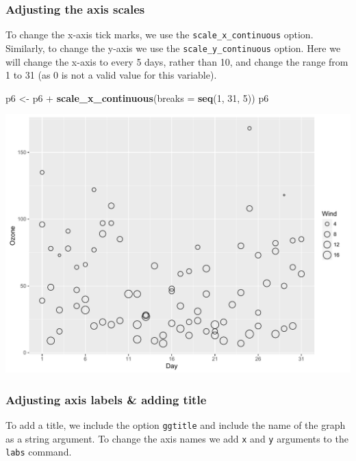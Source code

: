 \documentclass[]{article}
\newenvironment{Shaded}{\begin{snugshade}}{\end{snugshade}}
\newcommand{\KeywordTok}[1]{\textcolor[rgb]{0.13,0.29,0.53}{\textbf{{#1}}}}
\newcommand{\DataTypeTok}[1]{\textcolor[rgb]{0.13,0.29,0.53}{{#1}}}
\newcommand{\DecValTok}[1]{\textcolor[rgb]{0.00,0.00,0.81}{{#1}}}
\newcommand{\StringTok}[1]{\textcolor[rgb]{0.31,0.60,0.02}{{#1}}}
\newcommand{\NormalTok}[1]{{#1}}
\begin{document}
\subsubsection{Adjusting the axis
scales}\label{adjusting-the-axis-scales-1}

To change the x-axis tick marks, we use the
\texttt{scale\_x\_continuous} option. Similarly, to change the y-axis we
use the \texttt{scale\_y\_continuous} option. Here we will change the
x-axis to every 5 days, rather than 10, and change the range from 1 to
31 (as 0 is not a valid value for this variable).

\begin{Shaded}
\begin{Highlighting}[]
\NormalTok{p6 <-}\StringTok{ }\NormalTok{p6 +}\StringTok{ }\KeywordTok{scale_x_continuous}\NormalTok{(}\DataTypeTok{breaks =} \KeywordTok{seq}\NormalTok{(}\DecValTok{1}\NormalTok{, }\DecValTok{31}\NormalTok{, }\DecValTok{5}\NormalTok{))}
\NormalTok{p6}
\end{Highlighting}
\end{Shaded}

\begin{center}\includegraphics{0_all_posts_pdf/wscatter_4-1} \end{center}

\subsubsection{Adjusting axis labels \& adding
title}\label{adjusting-axis-labels-adding-title-4}

To add a title, we include the option \texttt{ggtitle} and include the
name of the graph as a string argument. To change the axis names we add
\texttt{x} and \texttt{y} arguments to the \texttt{labs} command.
\end{document}
